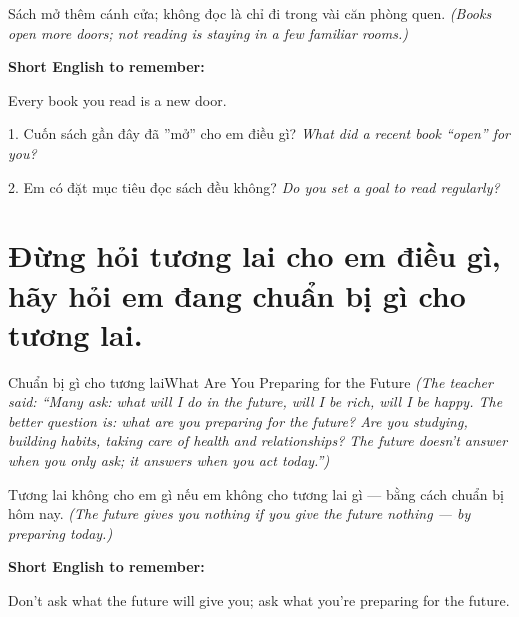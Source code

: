 \begin{baihoc}
Sách mở thêm cánh cửa; không đọc là chỉ đi trong vài căn phòng quen.
\textit{(Books open more doors; not reading is staying in a few familiar rooms.)}
\end{baihoc}

\begin{ghinhoanh}
\textbf{Short English to remember:}

Every book you read is a new door.

\end{ghinhoanh}

\begin{tuhocnhanh}
1. Cuốn sách gần đây đã ''mở'' cho em điều gì? \textit{What did a recent book ``open'' for you?}

2. Em có đặt mục tiêu đọc sách đều không? \textit{Do you set a goal to read regularly?}
\end{tuhocnhanh}
\ngancach

\section{Đừng hỏi tương lai cho em điều gì, hãy hỏi em đang chuẩn bị gì cho tương lai.}
\begin{truyen}{Chuẩn bị gì cho tương lai}{What Are You Preparing for the Future}
\textit{(The teacher said: ``Many ask: what will I do in the future, will I be rich, will I be happy. The better question is: what are you preparing for the future? Are you studying, building habits, taking care of health and relationships? The future doesn't answer when you only ask; it answers when you act today.'')}
\end{truyen}

\begin{baihoc}
Tương lai không cho em gì nếu em không cho tương lai gì — bằng cách chuẩn bị hôm nay.
\textit{(The future gives you nothing if you give the future nothing — by preparing today.)}
\end{baihoc}

\begin{ghinhoanh}
\textbf{Short English to remember:}

Don't ask what the future will give you; ask what you're preparing for the future.

\end{ghinhoanh}

